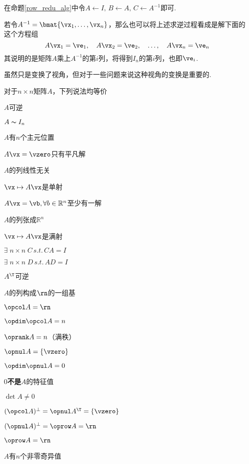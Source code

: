 \begin{analysis}
在命题\ref{row_redu_alg}中令$A\gets I,\,B\gets A,\,C\gets A^{-1}$即可.
\end{analysis}
若令$A^{-1}=\bmat{\vx_1,\ldots,\vx_n}$，那么也可以将上述求逆过程看成是解下面的这个方程组
\[A\vx_1=\ve_1,\quad A\vx_2=\ve_2,\quad\dots,\quad A\vx_n=\ve_n\]
其说明的是矩阵$A$乘上$A^{-1}$的第$i$列，将得到$I_n$的第$i$列，也即$\ve_i$.
\par 虽然只是变换了视角，但对于一些问题来说这种视角的变换是重要的.
\newpage
\begin{theorem}[可逆阵定理]
对于$n\times n$矩阵$A$，下列说法均等价
\begin{multicols}{2} %
\begin{partlist}
	\item $A$可逆
	\item $A\thicksim I_n$
	\item $A$有$n$个主元位置
	\item $A\vx=\vzero$只有平凡解
	\item $A$的列线性无关
	\item $\vx\mapsto A\vx$是单射
	\item $A\vx=\vb,\forall b\in\mathbb{R}^n$至少有一解
	\item $A$的列张成$\mathbb{R}^n$
	\item $\vx\mapsto A\vx$是满射
	\item $\exists\;n\times n\;C\,s.t.\,CA=I$
	\item $\exists\;n\times n\;D\,s.t.\,AD=I$
	\item $A^\T$可逆
	\item $A$的列构成$\rn$的一组基
	\item $\opcol A=\rn$
	\item $\opdim\opcol A=n$
	\item $\oprank A=n$（满秩）
	\item $\opnul A=\{\vzero\}$
	\item $\opdim\opnul A=0$
	\item $0$\textbf{不是}$A$的特征值
	\item $\det A\ne 0$
	\item $(\opcol A)^\perp=\opnul A^\T=\{\vzero\}$
	\item $(\opnul A)^\perp=\oprow A=\rn$
	\item $\oprow A=\rn$
	\item $A$有$n$个非零奇异值
\end{partlist}
\end{multicols}
\end{theorem}
